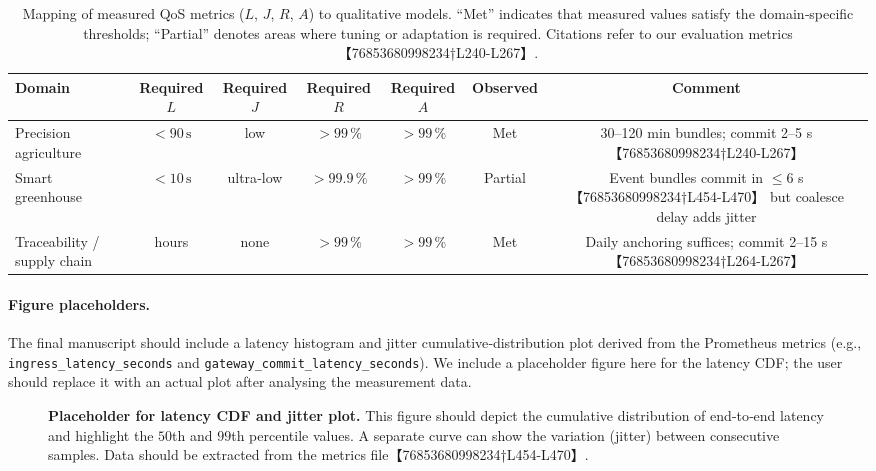 \documentclass[12pt,onecolumn]{IEEEtran} %
\begin{document}
\begin{table}[ht]
  \centering
  \caption{Mapping of measured QoS metrics (\(L\), \(J\), \(R\), \(A\)) to qualitative models.  ``Met'' indicates that measured values satisfy the domain‑specific thresholds; ``Partial'' denotes areas where tuning or adaptation is required.  Citations refer to our evaluation metrics【76853680998234†L240-L267】.}
  \label{tab:qos-map}
  \begin{tabular}{lcccccc}
    \toprule
    \textbf{Domain} & \textbf{Required \(L\)} & \textbf{Required \(J\)} & \textbf{Required \(R\)} & \textbf{Required \(A\)} & \textbf{Observed} & \textbf{Comment} \\
    \midrule
    Precision agriculture & $<90\,\text{s}$ & low & $>99\,\%$ & $>99\,\%$ & Met & 30–120 min bundles; commit 2–5 s【76853680998234†L240-L267】 \\
    Smart greenhouse & $<10\,\text{s}$ & ultra‑low & $>99.9\,\%$ & $>99\,\%$ & Partial & Event bundles commit in $\le6$ s【76853680998234†L454-L470】 but coalesce delay adds jitter \\
    Traceability / supply chain & hours & none & $>99\,\%$ & $>99\,\%$ & Met & Daily anchoring suffices; commit 2–15 s【76853680998234†L264-L267】 \\
    \bottomrule
  \end{tabular}
\end{table}

\paragraph{Figure placeholders.}  The final manuscript should include a latency histogram and jitter cumulative‑distribution plot derived from the Prometheus metrics (e.g., \texttt{ingress\_latency\_seconds} and \texttt{gateway\_commit\_latency\_seconds}).  We include a placeholder figure here for the latency CDF; the user should replace it with an actual plot after analysing the measurement data.
\begin{figure}[h]
  \centering
  \caption{\textbf{Placeholder for latency CDF and jitter plot.}  This figure should depict the cumulative distribution of end‑to‑end latency and highlight the \(50\)th and \(99\)th percentile values.  A separate curve can show the variation (jitter) between consecutive samples.  Data should be extracted from the metrics file【76853680998234†L454-L470】.}
  \label{fig:latency-cdf}
\end{figure}
\end{document}

